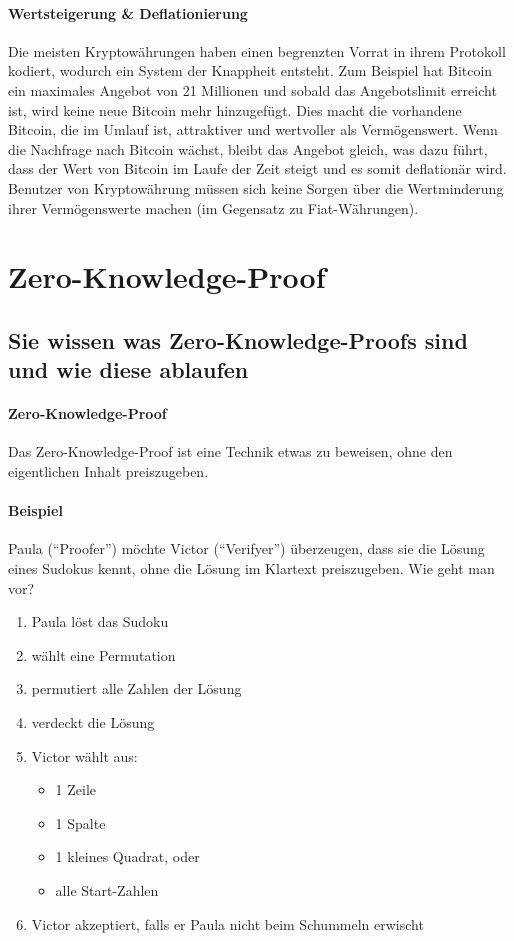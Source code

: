 \documentclass[10pt,a4paper]{article}
\begin{document}
\paragraph*{Wertsteigerung \& Deflationierung}
Die meisten Kryptowährungen haben einen begrenzten Vorrat in ihrem Protokoll kodiert, wodurch ein System der Knappheit entsteht. Zum Beispiel hat Bitcoin ein maximales Angebot von 21 Millionen und sobald das Angebotslimit erreicht ist, wird keine neue Bitcoin mehr hinzugefügt. Dies macht die vorhandene Bitcoin, die im Umlauf ist, attraktiver und wertvoller als Vermögenswert. Wenn die Nachfrage nach Bitcoin wächst, bleibt das Angebot gleich, was dazu führt, dass der Wert von Bitcoin im Laufe der Zeit steigt und es somit deflationär wird. Benutzer von Kryptowährung müssen sich keine Sorgen über die Wertminderung ihrer Vermögenswerte machen (im Gegensatz zu Fiat-Währungen).

\pagebreak
\section{Zero-Knowledge-Proof}
\subsection*{Sie wissen was Zero-Knowledge-Proofs sind und wie diese ablaufen}
\paragraph*{Zero-Knowledge-Proof}Das Zero-Knowledge-Proof ist eine Technik etwas zu beweisen, ohne den eigentlichen Inhalt preiszugeben.

\paragraph*{Beispiel}Paula ("`Proofer"') möchte Victor ("`Verifyer"') überzeugen, dass sie die Lösung eines Sudokus kennt, ohne die Lösung im Klartext preiszugeben. Wie geht man vor?
\begin{enumerate}[noitemsep,topsep=0pt,leftmargin=*]
    \item Paula löst das Sudoku
    \item wählt eine Permutation
    \item permutiert alle Zahlen der Lösung
    \item verdeckt die Lösung
    \item Victor wählt aus:
    \begin{itemize}[noitemsep,topsep=0pt,leftmargin=*]
        \item 1 Zeile
        \item 1 Spalte
        \item 1 kleines Quadrat, oder
        \item alle Start-Zahlen
    \end{itemize}
    \item Victor akzeptiert, falls er Paula nicht beim Schummeln erwischt
\end{enumerate}
\end{document}
